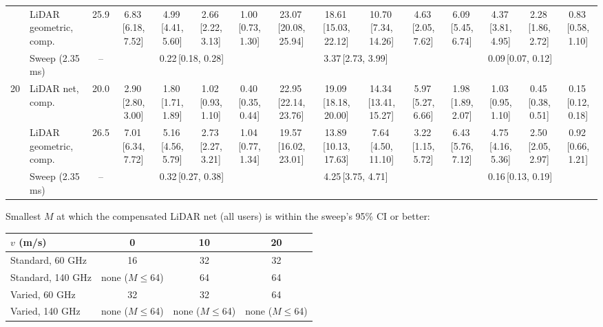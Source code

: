 \begin{table}[t]
{\begin{tabular}{@{}llccccccccccccc@{}}
 & LiDAR geometric, comp. & 25.9 & 6.83\,[6.18, 7.52] & 4.99\,[4.41, 5.60] & 2.66\,[2.22, 3.13] & 1.00\,[0.73, 1.30] & 23.07\,[20.08, 25.94] & 18.61\,[15.03, 22.12] & 10.70\,[7.34, 14.26] & 4.63\,[2.05, 7.62] & 6.09\,[5.45, 6.74] & 4.37\,[3.81, 4.95] & 2.28\,[1.86, 2.72] & 0.83\,[0.58, 1.10] \\
 & Sweep (2.35 ms) & -- & \multicolumn{4}{c}{0.22\,[0.18, 0.28]} & \multicolumn{4}{c}{3.37\,[2.73, 3.99]} & \multicolumn{4}{c}{0.09\,[0.07, 0.12]} \\
20 & LiDAR net, comp. & 20.0 & 2.90\,[2.80, 3.00] & 1.80\,[1.71, 1.89] & 1.02\,[0.93, 1.10] & 0.40\,[0.35, 0.44] & 22.95\,[22.14, 23.76] & 19.09\,[18.18, 20.00] & 14.34\,[13.41, 15.27] & 5.97\,[5.27, 6.66] & 1.98\,[1.89, 2.07] & 1.03\,[0.95, 1.10] & 0.45\,[0.38, 0.51] & 0.15\,[0.12, 0.18] \\
 & LiDAR geometric, comp. & 26.5 & 7.01\,[6.34, 7.72] & 5.16\,[4.56, 5.79] & 2.73\,[2.27, 3.21] & 1.04\,[0.77, 1.34] & 19.57\,[16.02, 23.01] & 13.89\,[10.13, 17.63] & 7.64\,[4.50, 11.10] & 3.22\,[1.15, 5.72] & 6.43\,[5.76, 7.12] & 4.75\,[4.16, 5.36] & 2.50\,[2.05, 2.97] & 0.92\,[0.66, 1.21] \\
 & Sweep (2.35 ms) & -- & \multicolumn{4}{c}{0.32\,[0.27, 0.38]} & \multicolumn{4}{c}{4.25\,[3.75, 4.71]} & \multicolumn{4}{c}{0.16\,[0.13, 0.19]} \\
\bottomrule\end{tabular}}

\medskip\small Smallest $M$ at which the compensated LiDAR net (all users) is within the sweep's 95\% CI or better:

\begin{tabular}{@{}lccc@{}}\toprule
$v$ (m/s) & 0 & 10 & 20 \\\midrule
Standard, 60 GHz & 16 & 32 & 32 \\
Standard, 140 GHz & none ($M\leq$64) & 64 & 64 \\
Varied, 60 GHz & 32 & 32 & 64 \\
Varied, 140 GHz & none ($M\leq$64) & none ($M\leq$64) & none ($M\leq$64) \\
\bottomrule\end{tabular}\end{table}
